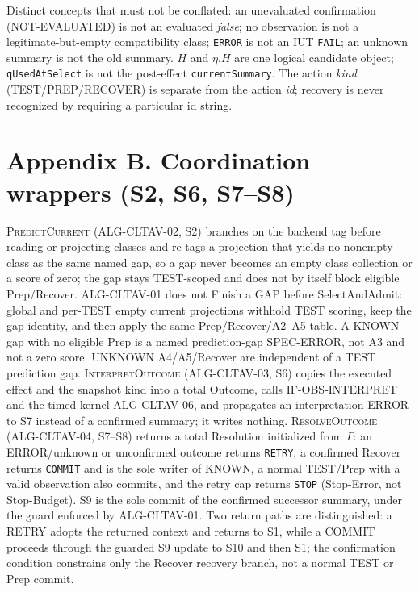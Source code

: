 \noindent Distinct concepts that must not be conflated: an unevaluated
confirmation (NOT-EVALUATED) is not an evaluated \emph{false}; no observation is
not a legitimate-but-empty compatibility class; \texttt{ERROR} is not an IUT
\texttt{FAIL}; an unknown summary is not the old summary. $H$ and $\eta.H$ are one
logical candidate object; \texttt{qUsedAtSelect} is not the post-effect
\texttt{currentSummary}. The action \emph{kind} (TEST/PREP/RECOVER) is separate
from the action \emph{id}; recovery is never recognized by requiring a particular
id string.

\section*{Appendix B. Coordination wrappers (S2, S6, S7--S8)}
\label{app:cltav-coordination}

\textsc{PredictCurrent} (ALG-CLTAV-02, S2) branches on the backend tag before
reading or projecting classes and re-tags a projection that yields no nonempty
class as the same named gap, so a gap never becomes an empty class collection or
a score of zero; the gap stays TEST-scoped and does not by itself block eligible
Prep/Recover. ALG-CLTAV-01 does not Finish a GAP before SelectAndAdmit: global
and per-TEST empty current projections withhold TEST scoring, keep the gap
identity, and then apply the same Prep/Recover/A2--A5 table. A KNOWN gap with no
eligible Prep is a named prediction-gap SPEC-ERROR, not A3 and not a zero score.
UNKNOWN A4/A5/Recover are independent of a TEST prediction gap. \textsc{InterpretOutcome} (ALG-CLTAV-03, S6) copies the executed
effect and the snapshot kind into a total Outcome, calls IF-OBS-INTERPRET and the
timed kernel ALG-CLTAV-06, and propagates an interpretation ERROR to S7 instead
of a confirmed summary; it writes nothing. \textsc{ResolveOutcome} (ALG-CLTAV-04,
S7--S8) returns a total Resolution initialized from $\Gamma$: an ERROR/unknown or
unconfirmed outcome returns \texttt{RETRY}, a confirmed Recover returns
\texttt{COMMIT} and is the sole writer of KNOWN, a normal TEST/Prep with a valid
observation also commits, and the retry cap returns \texttt{STOP} (Stop-Error, not
Stop-Budget). S9 is the sole commit of the confirmed successor summary, under the
guard enforced by ALG-CLTAV-01. Two return paths are distinguished: a RETRY
adopts the returned context and returns to S1, while a COMMIT proceeds through
the guarded S9 update to S10 and then S1; the confirmation condition constrains
only the Recover recovery branch, not a normal TEST or Prep commit.

